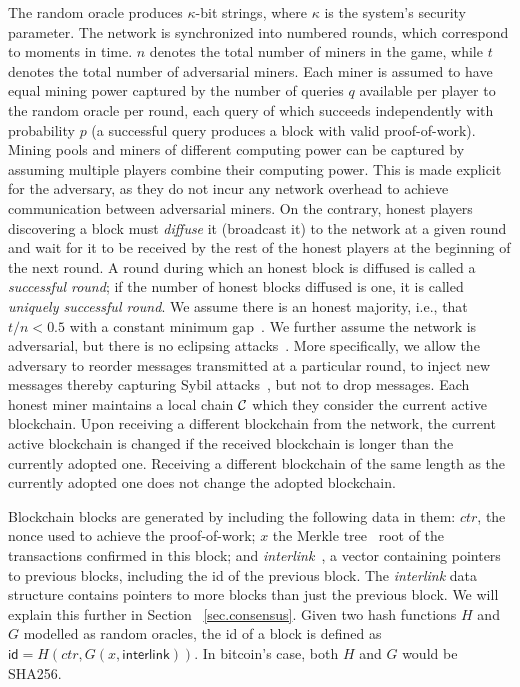 The random oracle produces $\kappa$-bit strings, where $\kappa$ is the system's
security parameter. The network is synchronized into numbered rounds, which
correspond to moments in time. $n$ denotes the total number of miners in the
game, while $t$ denotes the total number of adversarial miners. Each miner is
assumed to have equal mining power captured by the number of queries $q$
available per player to the random oracle per round, each query of which
succeeds independently with probability $p$ (a successful query produces a block
with valid proof-of-work). Mining pools and miners of different computing power
can be captured by assuming multiple players combine their computing power. This
is made explicit for the adversary, as they do not incur any network overhead to
achieve communication between adversarial miners. On the contrary, honest
players discovering a block must \textit{diffuse} it (broadcast it) to the
network at a given round and wait for it to be received by the rest of the
honest players at the beginning of the next round. A round during which an
honest block is diffused is called a \textit{successful round}; if the number of
honest blocks diffused is one, it is called \textit{uniquely successful round}.
We assume there is an honest majority, i.e., that $t / n < 0.5$ with a constant
minimum gap~\cite{backbone}. We further assume the network is adversarial, but
there is no eclipsing attacks~\cite{heilman2015eclipse}. More specifically, we
allow the adversary to reorder messages transmitted at a particular round, to
inject new messages thereby capturing Sybil attacks~\cite{sybil}, but not to
drop messages. Each honest miner maintains a local chain $\mathcal{C}$ which they
consider the current active blockchain. Upon receiving a different blockchain
from the network, the current active blockchain is changed if the received
blockchain is longer than the currently adopted one. Receiving a different
blockchain of the same length as the currently adopted one does not change the
adopted blockchain.

Blockchain blocks are generated by including the following data in them: $ctr$,
the nonce used to achieve the proof-of-work; $x$ the Merkle tree~\cite{merkle}
root of the transactions confirmed in this block; and
\textit{interlink}~\cite{KLS}, a vector containing pointers to previous blocks,
including the id of the previous block. The \textit{interlink} data structure
contains pointers to more blocks than just the previous block. We will explain
this further in Section~ \ref{sec.consensus}. Given two hash functions $H$ and
$G$ modelled as random oracles, the id of a block is defined as $\textsf{id} =
H(ctr, G(x, \textsf{interlink}))$. In bitcoin's case, both $H$ and $G$ would be
SHA256.

